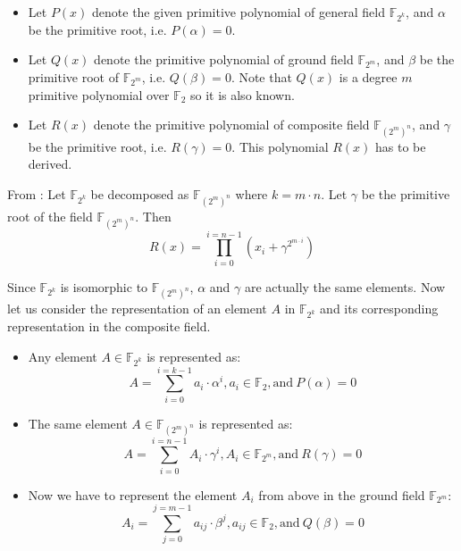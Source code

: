 \begin{itemize}
\item  Let $P(x)$ denote the given primitive polynomial of general
  field  $\mathbb{F}_{2^k}$, and $\alpha$ be the primitive root, i.e. $P(\alpha)=0$.  
\item Let $Q(x)$ denote the primitive polynomial of ground field
  $\mathbb{F}_{2^m}$, and $\beta$ be the primitive root of $\mathbb{F}_{2^m}$,
  i.e. $Q(\beta)=0$. Note that $Q(x)$ is a degree $m$ primitive
  polynomial over $\mathbb{F}_{2}$ so it is also known. 
\item Let $R(x)$ denote the primitive polynomial of composite field
  $\mathbb{F}_{(2^m)^n}$, and $\gamma$ be the primitive root,
  i.e. $R(\gamma)=0$. This polynomial $R(x)$ has to be derived. 
\end{itemize}

\begin{Lemma}
From \cite{cf:2003}: Let $\mathbb{F}_{2^k}$ be decomposed as $\mathbb{F}_{(2^m)^n}$
where $k = m\cdot n$. Let $\gamma$ be the primitive root of the field $\mathbb{F}_{(2^m)^n}$. 
Then 
\begin{equation}
R(x)=\prod_{i=0}^{i=n-1}(x_i+\gamma^{2^{m \cdot i}})
\end{equation}
\end{Lemma}

Since $\mathbb{F}_{2^k}$ is isomorphic to $\mathbb{F}_{(2^m)^n}$, $\alpha$ and
$\gamma$ are actually the same elements. 
Now let us consider the representation of an element $A$ in $\mathbb{F}_{2^k}$ and its corresponding
representation in the composite field. 

\begin{itemize}
\item Any element $A \in \mathbb{F}_{2^k}$ is represented as:
\begin{equation}
A=\sum_{i=0}^{i=k-1}a_i \cdot \alpha^i, a_i \in \mathbb{F}_{2}, \text{and}\	 P(\alpha) = 0
\end{equation}
\item The same element $A \in \mathbb{F}_{(2^m)^n}$ is represented as:
\begin{equation}
A=\sum_{i=0}^{i=n-1}A_i \cdot \gamma^i, A_i \in \mathbb{F}_{2^m}, \text{and} \	 R(\gamma) = 0
\end{equation}

\item
Now we have to represent the element $A_i$ from above in the ground
field $\mathbb{F}_{2^m}$:
\begin{equation}
A_i=\sum_{j=0}^{j=m-1}a_{ij} \cdot \beta^j, a_{ij} \in \mathbb{F}_{2}, \text{and} \	 Q(\beta) = 0
\end{equation}

\end{itemize}

